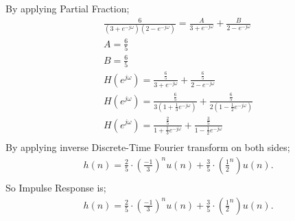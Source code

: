 \documentclass[10pt,a4paper, margin=1in]{article}
\begin{document}
\begin{enumerate}
\begin{enumerate}
By applying Partial Fraction; 
    \begin{align*}
        \frac{6}{(3+e^{-j\omega})(2-e^{-j\omega})} = \frac{A}{3+e^{-j\omega}} + \frac{B}{2-e^{-j\omega}}\\
        A= \frac{6}{5}\\
        B= \frac{6}{5}\\
        H(e^{j\omega}) = \frac{\frac{6}{5}}{3+e^{-j\omega}} + \frac{\frac{6}{5}}{2-e^{-j\omega}}\\
        H(e^{j\omega}) = \frac{\frac{6}{5}}{3(1+\frac{1}{3}e^{-j\omega})} + \frac{\frac{6}{5}}{2(1-\frac{1}{2}e^{-j\omega})}\\
        H(e^{j\omega}) = \frac{\frac{2}{5}}{1+\frac{1}{3}e^{-j\omega}} + \frac{\frac{3}{5}}{1-\frac{1}{2}e^{-j\omega}}\\
    \end{align*}
By applying inverse Discrete-Time Fourier transform on both sides;
    \begin{align*}
        h(n) = \frac{2}{5} \cdot (\frac{-1}{3})^{n}u(n) + \frac{3}{5} \cdot (\frac{1}{2}^{n})u(n).\\
    \end{align*}
    So Impulse Response is;
    \begin{align*}
        h(n) = \frac{2}{5} \cdot (\frac{-1}{3})^{n}u(n) + \frac{3}{5} \cdot (\frac{1}{2}^{n})u(n).
    \end{align*}
    \end{enumerate}    

\end{enumerate}
\end{document}

